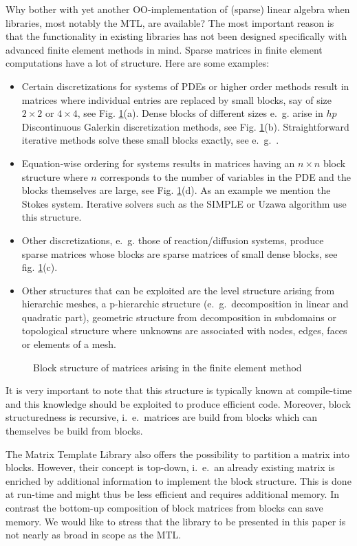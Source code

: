 \documentclass[11pt]{article}
\begin{document}
Why bother with yet another OO-implementation of (sparse) linear
algebra when libraries, most notably the MTL, are available? The most
important reason is that the functionality in existing libraries has
not been designed specifically with advanced finite element methods in
mind. Sparse matrices in finite element computations have a lot of
structure. Here are some examples:
\begin{itemize}
\item Certain discretizations for systems of PDEs or higher order
  methods result in matrices where individual entries are replaced by
  small blocks, say of size $2\times 2$ or $4\times 4$, see
  Fig. \ref{fig:festructure}(a).  Dense blocks of different sizes
  e.~g. arise in $hp$ Discontinuous Galerkin discretization methods,
  see Fig. \ref{fig:festructure}(b). Straightforward
  iterative methods solve these small blocks exactly, see
  e.~g.~\cite{BH99}.
\item Equation-wise ordering for systems results in matrices having an
  $n\times n$ block structure where $n$ corresponds to the number of
  variables in the PDE and the blocks themselves are large, see Fig.
  \ref{fig:festructure}(d). As an
  example we mention the Stokes system. Iterative solvers such as the
  SIMPLE or Uzawa algorithm use this structure.
\item Other discretizations, e.~g. those of reaction/diffusion
  systems,  produce sparse matrices whose blocks are
  sparse matrices of small dense blocks, see fig. \ref{fig:festructure}(c).
\item Other structures that can be exploited are the level structure
  arising from hierarchic meshes, a p-hierarchic
  structure (e.~g.~decomposition in linear and quadratic part),
  geometric structure from decomposition in subdomains or topological
  structure where unknowns are associated with nodes, edges, faces or
  elements of a mesh.
\end{itemize}
\begin{figure}[htb]
  \centering
  \caption{Block structure of matrices arising in the finite element method}
  \label{fig:festructure}
\end{figure}
It is very important to note that this structure is typically known at
compile-time and this knowledge should be exploited to produce
efficient code. Moreover, block structuredness is recursive,
i.~e.~matrices are build from blocks which can themselves be build from
blocks. 

The Matrix Template Library also offers the possibility to partition a
matrix into blocks. However, their concept is top-down, i.~e.~an
already existing matrix is enriched by additional information to
implement the block structure. This is done at run-time and might thus
be less efficient and requires additional memory. In contrast the
bottom-up composition of block matrices from blocks can save memory.
We would like to stress that the library to be presented in this paper
is not nearly as broad in scope as the MTL.
\end{document}
